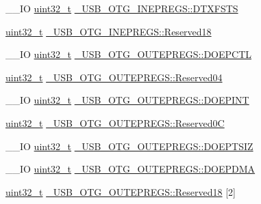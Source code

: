 \begin{DoxyCompactItemize}
\item 
\-\_\-\-\_\-\-I\-O \hyperlink{stdint_8h_a435d1572bf3f880d55459d9805097f62}{uint32\-\_\-t} \hyperlink{group___u_s_b___o_t_g___d_r_i_v_e_r_ga3202292a0e13e390381086f93ad3e8b9}{\-\_\-\-U\-S\-B\-\_\-\-O\-T\-G\-\_\-\-I\-N\-E\-P\-R\-E\-G\-S\-::\-D\-T\-X\-F\-S\-T\-S}
\item 
\hyperlink{stdint_8h_a435d1572bf3f880d55459d9805097f62}{uint32\-\_\-t} \hyperlink{group___u_s_b___o_t_g___d_r_i_v_e_r_ga656e65007c1967f02d8000c79d70f739}{\-\_\-\-U\-S\-B\-\_\-\-O\-T\-G\-\_\-\-I\-N\-E\-P\-R\-E\-G\-S\-::\-Reserved18}
\item 
\-\_\-\-\_\-\-I\-O \hyperlink{stdint_8h_a435d1572bf3f880d55459d9805097f62}{uint32\-\_\-t} \hyperlink{group___u_s_b___o_t_g___d_r_i_v_e_r_ga4d04fed35191712f93a6ccff18624968}{\-\_\-\-U\-S\-B\-\_\-\-O\-T\-G\-\_\-\-O\-U\-T\-E\-P\-R\-E\-G\-S\-::\-D\-O\-E\-P\-C\-T\-L}
\item 
\hyperlink{stdint_8h_a435d1572bf3f880d55459d9805097f62}{uint32\-\_\-t} \hyperlink{group___u_s_b___o_t_g___d_r_i_v_e_r_gafa7d72460d6ddee492c7ad38713ebec5}{\-\_\-\-U\-S\-B\-\_\-\-O\-T\-G\-\_\-\-O\-U\-T\-E\-P\-R\-E\-G\-S\-::\-Reserved04}
\item 
\-\_\-\-\_\-\-I\-O \hyperlink{stdint_8h_a435d1572bf3f880d55459d9805097f62}{uint32\-\_\-t} \hyperlink{group___u_s_b___o_t_g___d_r_i_v_e_r_ga33bf764a1d886fa29ae0de777d9b959f}{\-\_\-\-U\-S\-B\-\_\-\-O\-T\-G\-\_\-\-O\-U\-T\-E\-P\-R\-E\-G\-S\-::\-D\-O\-E\-P\-I\-N\-T}
\item 
\hyperlink{stdint_8h_a435d1572bf3f880d55459d9805097f62}{uint32\-\_\-t} \hyperlink{group___u_s_b___o_t_g___d_r_i_v_e_r_ga2e636863dbc994524da501268f21505d}{\-\_\-\-U\-S\-B\-\_\-\-O\-T\-G\-\_\-\-O\-U\-T\-E\-P\-R\-E\-G\-S\-::\-Reserved0\-C}
\item 
\-\_\-\-\_\-\-I\-O \hyperlink{stdint_8h_a435d1572bf3f880d55459d9805097f62}{uint32\-\_\-t} \hyperlink{group___u_s_b___o_t_g___d_r_i_v_e_r_ga7ac3779b2ae08f30c45376e163cab08c}{\-\_\-\-U\-S\-B\-\_\-\-O\-T\-G\-\_\-\-O\-U\-T\-E\-P\-R\-E\-G\-S\-::\-D\-O\-E\-P\-T\-S\-I\-Z}
\item 
\-\_\-\-\_\-\-I\-O \hyperlink{stdint_8h_a435d1572bf3f880d55459d9805097f62}{uint32\-\_\-t} \hyperlink{group___u_s_b___o_t_g___d_r_i_v_e_r_ga1f8492adce7a4733113647fe8e4e85ee}{\-\_\-\-U\-S\-B\-\_\-\-O\-T\-G\-\_\-\-O\-U\-T\-E\-P\-R\-E\-G\-S\-::\-D\-O\-E\-P\-D\-M\-A}
\item 
\hyperlink{stdint_8h_a435d1572bf3f880d55459d9805097f62}{uint32\-\_\-t} \hyperlink{group___u_s_b___o_t_g___d_r_i_v_e_r_ga482e8418ccf987e052376b2b1b61410e}{\-\_\-\-U\-S\-B\-\_\-\-O\-T\-G\-\_\-\-O\-U\-T\-E\-P\-R\-E\-G\-S\-::\-Reserved18} \mbox{[}2\mbox{]}

\end{DoxyCompactItemize}
